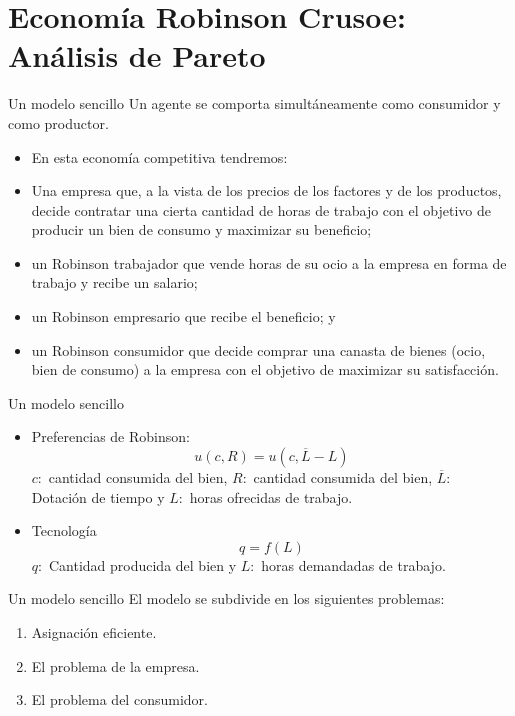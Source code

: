 \section[Robinson Crusoe]{Economía Robinson Crusoe: Análisis de Pareto}

\begin{frame}{Un modelo sencillo}
Un agente se comporta simultáneamente como consumidor y como productor.
	\begin{itemize}
		\item En esta economía competitiva tendremos:
		\item Una empresa que, a la vista de los precios de los factores y de los productos, decide contratar una cierta cantidad de horas de trabajo con el objetivo de producir un bien de consumo y maximizar su beneficio;
		\item un Robinson trabajador que vende horas de su ocio a la empresa en forma de trabajo y recibe un salario;
		\item un Robinson empresario que recibe el beneficio; y
		\item un Robinson consumidor que decide comprar una canasta de bienes (ocio, bien de consumo) a la empresa con el objetivo de maximizar su satisfacción.
	\end{itemize}
\end{frame}
\begin{frame}{Un modelo sencillo}
		\begin{itemize}
			\item Preferencias de Robinson:
						$$u(c,R)=u(c,\overline{L}-L)$$
					$c:$ cantidad consumida del bien, $R:$ cantidad consumida del bien, $\overline{L}:$ Dotación de tiempo y $L:$ horas ofrecidas de trabajo.
			\item Tecnología
						$$q=f(L)$$
					$q:$ Cantidad producida del bien y $L:$ horas demandadas de trabajo.
		\end{itemize}
\end{frame}
\begin{frame}{Un modelo sencillo}
	El modelo se subdivide en los siguientes problemas:
		\begin{enumerate}
			\item Asignación eficiente.
			\item El problema de la empresa.
			\item El problema del consumidor.
		\end{enumerate}
\end{frame}
